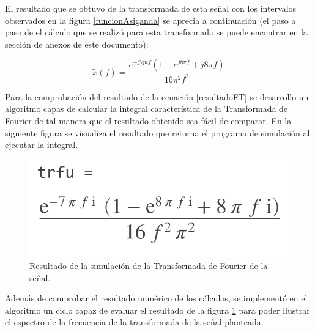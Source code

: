 \documentclass[11pt,letterpaper,twocolumn]{article}
\begin{document}
    El resultado que se obtuvo de la transformada de esta señal con los intervalos observados en la
    figura \ref{funcionAsiganda} se aprecia a continuación (el paso a paso de el cálculo que se 
    realizó para esta transformada se puede encontrar en la sección de anexos de este documento):
    
    \begin{equation}
        \tilde{x}(f) = \frac{e^{-j7pi f }(1 - e^{j8\pi f} + j8\pi f)}{16\pi^2 f^2}
        \label{resultadoFT}
    \end{equation} 

    Para la comprobación del resultado de la ecuación \ref{resultadoFT} se desarrollo un algoritmo 
    capas de calcular la integral característica de la Transformada de Fourier de tal manera que 
    el resultado obtenido sea fácil de comparar. En la siguiente figura se visualiza el resultado 
    que retorna el programa de simulación al ejecutar la integral.
    
    \begin{figure}[H]
        \centering 
        \centering
        \includegraphics[width=0.5\linewidth]{img/ResultadoEcuacionMATLAB.png}
        \caption{Resultado de la simulación de la Transformada de Fourier de la señal.}
        \label{resultadoEcuacionMATLAB}
    \end{figure} 
    
    Además de comprobar el resultado numérico de los cálculos, se implementó en el algoritmo un
    ciclo capaz de evaluar el resultado de la figura \ref{resultadoEcuacionMATLAB} para poder 
    ilustrar el espectro de la frecuencia de la transformada de la señal planteada.
     
\end{document}
